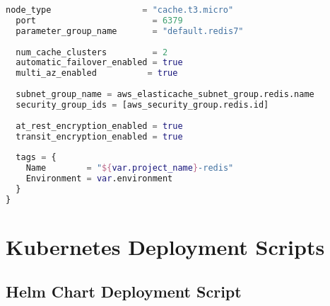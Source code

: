 \begin{lstlisting}[language=terraform]
  node_type                  = "cache.t3.micro"
  port                       = 6379
  parameter_group_name       = "default.redis7"
  
  num_cache_clusters         = 2
  automatic_failover_enabled = true
  multi_az_enabled          = true
  
  subnet_group_name = aws_elasticache_subnet_group.redis.name
  security_group_ids = [aws_security_group.redis.id]
  
  at_rest_encryption_enabled = true
  transit_encryption_enabled = true
  
  tags = {
    Name        = "${var.project_name}-redis"
    Environment = var.environment
  }
}
\end{lstlisting}

\section{Kubernetes Deployment Scripts}

\subsection{Helm Chart Deployment Script}

